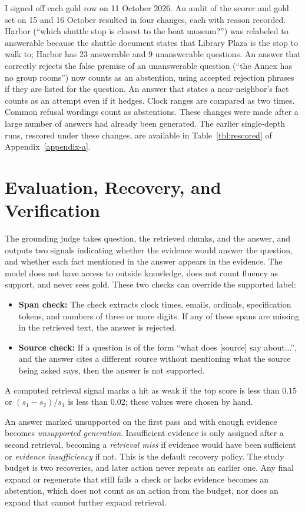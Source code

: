 \documentclass[12pt, a4paper, oneside]{report}
\newcommand{\code}[1]{\texttt{\detokenize{#1}}}
\begin{document}
I signed off each gold row on 11 October 2026. An audit of the scorer and
gold set on 15 and 16 October resulted in four changes, each with reason
recorded. Harbor \code{seed-007} (``which shuttle stop is closest to the
boat museum?'') was relabeled to answerable because the shuttle document
states that Library Plaza is the stop to walk to; Harbor has 23 answerable
and 9 unanswerable questions. An answer that correctly rejects the false
premise of an unanswerable question (``the Annex has no group rooms'') now
counts as an abstention, using accepted rejection phrases if they are listed
for the question. An answer that states a near-neighbor's fact counts as an
attempt even if it hedges. Clock ranges are compared as two times. Common
refusal wordings count as abstentions. These changes were made after a
large number of answers had already been generated. The earlier
single-depth runs, rescored under these changes, are available in
Table~\ref{tbl:rescored} of Appendix~\ref{appendix-a}.

\section{Evaluation, Recovery, and Verification}

The grounding judge takes question, the retrieved chunks, and the answer,
and outputs two signals indicating whether the evidence would answer the
question, and whether each fact mentioned in the answer appears in the
evidence. The model does not have access to outside knowledge, does not
count fluency as support, and never sees gold. These two checks can override
the supported label:
\begin{itemize}
\item \textbf{Span check:} The check extracts clock times, emails, ordinals,
  specification tokens, and numbers of three or more digits. If any of these spans
  are missing in the retrieved text, the answer is rejected.
\item \textbf{Source check:} If a question is of the form ``what does [source] say
  about...'', and the answer cites a different source without mentioning
  what the source being asked says, then the answer is not supported.
\end{itemize}

A computed retrieval signal marks a hit as weak if the top score is less
than $0.15$ or $(s_1-s_2)/s_1$ is less than $0.02$; these values were chosen
by hand.

An answer marked unsupported on the first pass and with enough evidence
becomes \emph{unsupported generation}. Insufficient evidence is only
assigned after a second retrieval, becoming a \emph{retrieval miss} if
evidence would have been sufficient or \emph{evidence insufficiency} if
not. This is the default recovery policy. The study budget is two
recoveries, and later action never repeats an earlier one. Any final expand
or regenerate that still fails a check or lacks evidence becomes an
abstention, which does not count as an action from the budget, nor does an
expand that cannot further expand retrieval.
\end{document}

